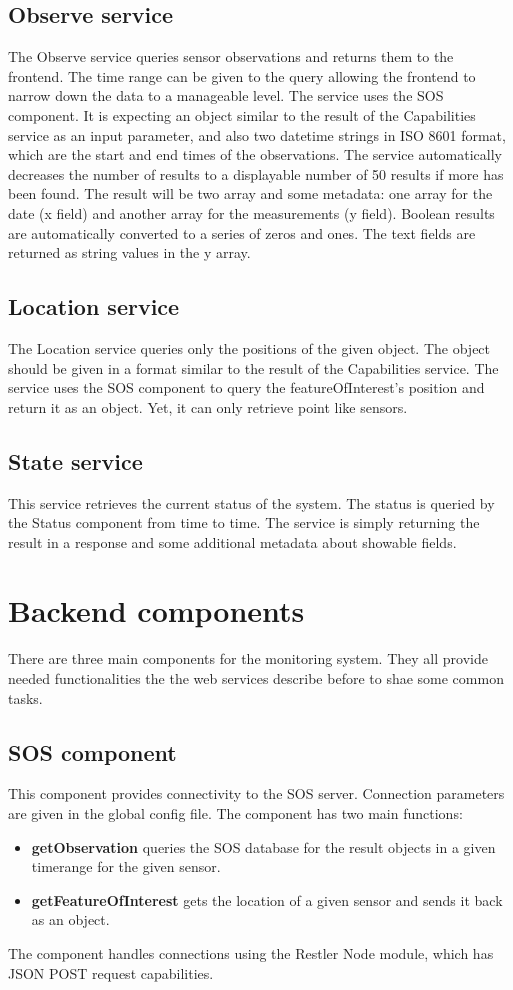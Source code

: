 \subsection{Observe service}
The Observe service queries sensor observations and returns them to the frontend.
The time range can be given to the query allowing the frontend to narrow down the data to a manageable level. The service uses the SOS component. It is expecting an object similar to the result of the Capabilities service as an input parameter, and also two datetime strings in ISO 8601 format, which are the start and end times of the observations. The service automatically decreases the number of results to a displayable number of 50 results if more has been found. The result will be two array and some metadata: one array for the date (x field) and another array for the measurements (y field). Boolean results are automatically converted to a series of zeros and ones. The text fields are returned as string values in the y array.

\subsection{Location service}
The Location service queries only the positions of the given object. The object should be given in a format similar to the result of the Capabilities service. The service uses the SOS component to query the featureOfInterest's position and return it as an object. Yet, it can only retrieve point like sensors.

\subsection{State service}
This service retrieves the current status of the system. The status is queried by the Status component from time to time. The service is simply returning the result in a response and some additional metadata about showable fields.

\section{Backend components}
There are three main components for the monitoring system. They all provide needed functionalities the the web services describe before to shae some common tasks.

\subsection{SOS component}
This component provides connectivity to the SOS server. Connection parameters are given in the global config file. The component has two main functions:
\begin{itemize}
\item \textbf{getObservation} queries the SOS database for the result objects in a given timerange for the given sensor.
\item \textbf{getFeatureOfInterest} gets the location of a given sensor and sends it back as an object.
\end{itemize}
The component handles connections using the Restler Node module, which has JSON POST request capabilities.

